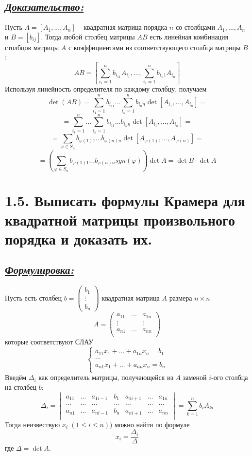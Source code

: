 \documentclass{article}
\begin{document}
\subsection*{\Large \underline{\textit{Доказательство: }}}
Пусть $A = [A_1, ..., A_n]$ -- квадратная матрица порядка $n$ со столбцами $A_1, ..., A_n$ и $B = [b_{ij}]$. Тогда любой столбец матрицы $AB$ есть линейная комбинация столбцов матрицы $A$ с коэффициентами из соответствующего столбца матрицы $B$:
$$
AB = \left[
\sum_{i_1 = 1}^n b_{i_11}A_{i_1}, ..., \sum_{i_1 = 1}^n b_{i_n1}A_{i_n}
\right]
$$
Используя линейность определителя по каждому столбцу, получаем
$$
\det{(AB)} = \sum_{i_1 = 1}^n b_{i_11} ... \sum_{i_n = 1}^n b_{i_nn} \det{[A_{i_1}, ..., A_{i_n}]} = 
$$
$$
= \sum_{i_1 = 1}^n ... \sum_{i_n = 1}^n b_{i_11}...b_{i_nn} \det{[A_{i_1}, ..., A_{i_n}]} = 
$$
$$
= \sum_{\varphi \in S_n} b_{\varphi(1)1}...b_{\varphi(n)n} \det{[A_{\varphi(1)}, ..., A_{\varphi(n)}]} = 
$$
$$
= \left( \sum_{\varphi \in S_n} b_{\varphi(1)1}...b_{\varphi(n)n}sgn(\varphi) \right)\det{A} = \det{B}\cdot\det{A}
$$

\section*{\LARGE 1.5. Выписать формулы Крамера для квадратной матрицы произвольного порядка и доказать их.}
\subsection*{\Large \underline{\textit{Формулировка: }}}
Пусть есть столбец $b = \begin{pmatrix} b_1 \\ \vdots \\ b_n \end{pmatrix}$ квадратная матрица $A$ размера $n \times n$
$$
A = 
\begin{pmatrix}
a_{11} & ... & a_{1n} \\
\vdots &  & \vdots \\
a_{n1} & ... & a_{nn} \\
\end{pmatrix}
$$
которые соответствуют СЛАУ
$$
\begin{cases}
a_{11}x_1 + ... + a_{1n}x_n = b_1 \\
... \\
a_{n1}x_1 + ... + a_{nn}x_n = b_n \\
\end{cases}
$$
Введём $\Delta_i$ как определитель матрицы, получающейся из $A$ заменой $i$-ого столбца на столбец $b$:
$$
\Delta_i = 
\begin{vmatrix}
a_{11} & ... & a_{1i-1} & b_1 & a_{1i+1} & ... & a_{1n} \\
... & ... & ... & ... & ... & ... & ... \\
a_{n1} & ... & a_{ni-1} & b_n & a_{ni+1} & ... & a_{nn} \\
\end{vmatrix} = 
\sum_{k = 1}^{n}b_iA_{ki}
$$
Тогда неизвествую $x_i \; (1 \le i \le n))$ можно найти по формуле
$$
x_i = \frac{\Delta_i}{\Delta}
$$
где $\Delta = \det{A}$.
\end{document}
